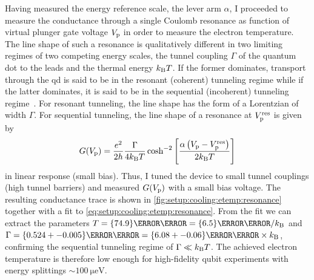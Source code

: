 Having measured the energy reference scale, the lever arm $\alpha$, I proceeded to measure the conductance through a single Coulomb resonance as function of virtual plunger gate voltage $V_{\mathrm{p}}$ in order to measure the electron temperature.
The line shape of such a resonance is qualitatively different in two limiting regimes of two competing energy scales, the tunnel coupling $\Gamma$ of the quantum dot to the leads and the thermal energy $k_{\mathrm{B}} T$.
If the former dominates, transport through the \gls{qd} is said to be in the resonant (coherent) tunneling regime while if the latter dominates, it is said to be in the sequential (incoherent) tunneling regime~\cite{Beenakker1991,Ihn2009}.
For resonant tunneling, the line shape has the form of a Lorentzian of width $\Gamma$.
For sequential tunneling, the line shape of a resonance at $V_{\mathrm{p}}^{\mathrm{res}}$ is given by~\cite{Beenakker1991}
\begin{equation}\label{eq:setup:cooling:etemp:resonance}
    G(V_{\mathrm{p}}) = \frac{e^2}{2h}\frac{\Gamma}{4k_{\mathrm{B}} T}\cosh^{-2}\left[\frac{\alpha\left(V_{\mathrm{p}} - V_{\mathrm{p}}^{\mathrm{res}}\right)}{2k_{\mathrm{B}} T}\right]
\end{equation}
in linear response (small bias).
Thus, I tuned the device to small tunnel couplings (high tunnel barriers) and measured $G(V_{\mathrm{p}})$ with a small bias voltage.
The resulting conductance trace is shown in \cref{fig:setup:cooling:etemp:resonance} together with a fit to \cref{eq:setup:cooling:etemp:resonance}.
From the fit we can extract the parameters $T = \qty{74.9}{\milli\kelvin} = \qty{6.5}{\micro\eV}/\kb$ and $\Gamma = \qty{0.524+-0.005}{\micro\eV} = \qty{6.08+-0.06}{\milli\kelvin}\times\kb$, confirming the sequential tunneling regime of $\Gamma\ll k_{\mathrm{B}} T$.
The achieved electron temperature is therefore low enough for high-fidelity qubit experiments with energy splittings $\sim\qty{100}{\micro\eV}$.
